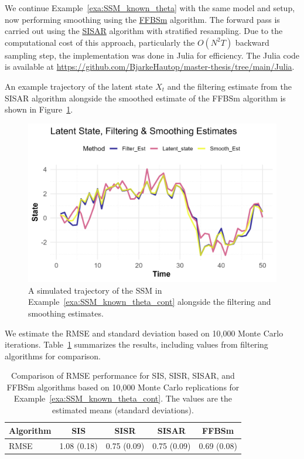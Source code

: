 \begin{example}
	\label{exa:SSM_known_theta_cont}
	We continue Example~\ref{exa:SSM_known_theta} with the same model and setup, now performing smoothing using the \hyperref[algo:FFBSm]{FFBSm} algorithm. The forward pass is carried out using the \hyperref[algo:SISAR]{SISAR} algorithm with stratified resampling. Due to the computational cost of this approach, particularly the $O(N^2T)$ backward sampling step, the implementation was done in Julia for efficiency. The Julia code is available at \url{https://github.com/BjarkeHautop/master-thesis/tree/main/Julia}. 
	
	An example trajectory of the latent state $X_t$ and the filtering estimate from the SISAR algorithm alongside the smoothed estimate of the FFBSm algorithm is shown in Figure~\ref{fig:filt_smooth_est}.   
	\begin{figure}
		\centering
		\includegraphics{Example_3.3_estimates.png}
		\caption{A simulated trajectory of the SSM in  Example~\ref{exa:SSM_known_theta_cont} alongside the filtering and smoothing estimates.}
		\label{fig:filt_smooth_est}
	\end{figure}
	We estimate the RMSE and standard deviation based on 10,000 Monte Carlo iterations.  Table~\ref{tab:performance_ext} summarizes the results, including values from filtering algorithms for comparison.
	\begin{table}
		\centering
		\begin{tabular}{lcccc}
			\toprule
			Algorithm & SIS & SISR & SISAR & FFBSm \\
			\midrule
			RMSE      & 1.08 (0.18) & 0.75 (0.09) & 0.75 (0.09) & 0.69 (0.08) \\
			\bottomrule
		\end{tabular}
		\caption{Comparison of RMSE performance for SIS, SISR, SISAR, and FFBSm algorithms based on 10,000 Monte Carlo replications for Example~\ref{exa:SSM_known_theta_cont}. The values are the estimated means (standard deviations).}
		\label{tab:performance_ext}
	\end{table}
\end{example}


